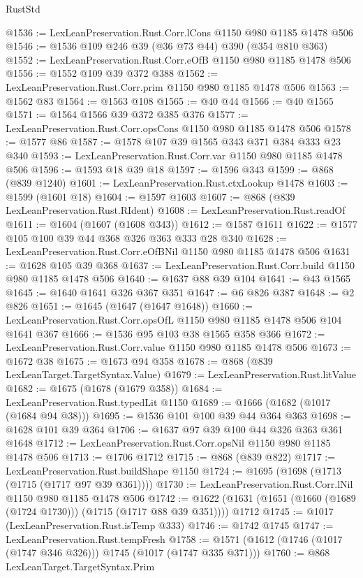 \begin{lexlean}{RustStd}
\begin{coremodule}
@1536 := LexLeanPreservation.Rust.Corr.lCons @1150 @980 @1185 @1478 @506
@1546 := @1536 @109 @246 @39 (@36 @73 @44) @390 (@354 @810 @363)
@1552 := LexLeanPreservation.Rust.Corr.eOfB @1150 @980 @1185 @1478 @506
@1556 := @1552 @109 @39 @372 @388
@1562 := LexLeanPreservation.Rust.Corr.prim @1150 @980 @1185 @1478 @506
@1563 := @1562 @83
@1564 := @1563 @108
@1565 := @40 @44
@1566 := @40 @1565
@1571 := @1564 @1566 @39 @372 @385 @376
@1577 := LexLeanPreservation.Rust.Corr.opsCons @1150 @980 @1185 @1478 @506
@1578 := @1577 @86
@1587 := @1578 @107 @39 @1565 @343 @371 @384 @333 @23 @340
@1593 := LexLeanPreservation.Rust.Corr.var @1150 @980 @1185 @1478 @506
@1596 := @1593 @18 @39 @18
@1597 := @1596 @343
@1599 := @868 (@839 @1240)
@1601 := LexLeanPreservation.Rust.ctxLookup @1478
@1603 := @1599 (@1601 @18)
@1604 := @1597 @1603
@1607 := @868 (@839 LexLeanPreservation.Rust.RIdent)
@1608 := LexLeanPreservation.Rust.readOf
@1611 := @1604 (@1607 (@1608 @343))
@1612 := @1587 @1611
@1622 := @1577 @105 @100 @39 @44 @368 @326 @363 @333 @28 @340
@1628 := LexLeanPreservation.Rust.Corr.eOfBNil @1150 @980 @1185 @1478 @506
@1631 := @1628 @105 @39 @368
@1637 := LexLeanPreservation.Rust.Corr.build @1150 @980 @1185 @1478 @506
@1640 := @1637 @88 @39 @104
@1641 := @43 @1565
@1645 := @1640 @1641 @326 @367 @351
@1647 := @6 @826 @387
@1648 := @2 @826
@1651 := @1645 (@1647 (@1647 @1648))
@1660 := LexLeanPreservation.Rust.Corr.opsOfL @1150 @980 @1185 @1478 @506 @104 @1641 @367
@1666 := @1536 @95 @103 @38 @1565 @358 @366
@1672 := LexLeanPreservation.Rust.Corr.value @1150 @980 @1185 @1478 @506
@1673 := @1672 @38
@1675 := @1673 @94 @358
@1678 := @868 (@839 LexLeanTarget.TargetSyntax.Value)
@1679 := LexLeanPreservation.Rust.litValue
@1682 := @1675 (@1678 (@1679 @358))
@1684 := LexLeanPreservation.Rust.typedLit @1150
@1689 := @1666 (@1682 (@1017 (@1684 @94 @38)))
@1695 := @1536 @101 @100 @39 @44 @364 @363
@1698 := @1628 @101 @39 @364
@1706 := @1637 @97 @39 @100 @44 @326 @363 @361 @1648
@1712 := LexLeanPreservation.Rust.Corr.opsNil @1150 @980 @1185 @1478 @506
@1713 := @1706 @1712
@1715 := @868 (@839 @822)
@1717 := LexLeanPreservation.Rust.buildShape @1150
@1724 := @1695 (@1698 (@1713 (@1715 (@1717 @97 @39 @361))))
@1730 := LexLeanPreservation.Rust.Corr.lNil @1150 @980 @1185 @1478 @506
@1742 := @1622 (@1631 (@1651 (@1660 (@1689 (@1724 @1730))) (@1715 (@1717 @88 @39 @351)))) @1712
@1745 := @1017 (LexLeanPreservation.Rust.isTemp @333)
@1746 := @1742 @1745
@1747 := LexLeanPreservation.Rust.tempFresh
@1758 := @1571 (@1612 (@1746 (@1017 (@1747 @346 @326))) @1745 (@1017 (@1747 @335 @371)))
@1760 := @868 LexLeanTarget.TargetSyntax.Prim

\end{coremodule}
\end{lexlean}
